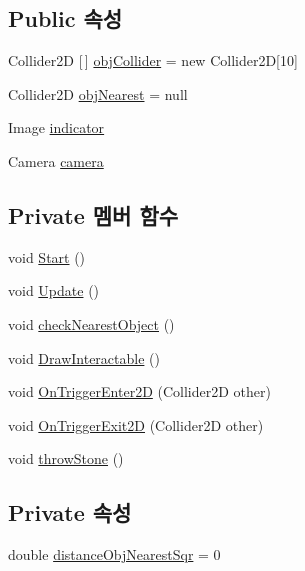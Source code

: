 \subsection*{Public 속성}
\begin{DoxyCompactItemize}
\item 
Collider2D \mbox{[}$\,$\mbox{]} \mbox{\hyperlink{class_interaction_a90d58795726d44ab3a4ba263d4bb232f}{obj\+Collider}} = new Collider2D\mbox{[}10\mbox{]}
\item 
Collider2D \mbox{\hyperlink{class_interaction_ae88d3a10f82937f62190d9a68e3e4fee}{obj\+Nearest}} = null
\item 
Image \mbox{\hyperlink{class_interaction_ab757635fb5137d0da6ced4a50b1ef612}{indicator}}
\item 
Camera \mbox{\hyperlink{class_interaction_a7c2a3d3cca0528ce35017a3f6c5f7822}{camera}}
\end{DoxyCompactItemize}
\subsection*{Private 멤버 함수}
\begin{DoxyCompactItemize}
\item 
void \mbox{\hyperlink{class_interaction_a01ca462a3b63fa7b3f58def0dcc5d8c9}{Start}} ()
\item 
void \mbox{\hyperlink{class_interaction_a411a0868d034a972335ede1c42088c5e}{Update}} ()
\item 
void \mbox{\hyperlink{class_interaction_a57f6e82265f1099e49b7429615ff593f}{check\+Nearest\+Object}} ()
\item 
void \mbox{\hyperlink{class_interaction_a99a346f8b614166a70976db9c7829d83}{Draw\+Interactable}} ()
\item 
void \mbox{\hyperlink{class_interaction_ac6a15155873618a49f8762db31645e9a}{On\+Trigger\+Enter2D}} (Collider2D other)
\item 
void \mbox{\hyperlink{class_interaction_ac372c750eadae87cb84a5505d92edc43}{On\+Trigger\+Exit2D}} (Collider2D other)
\item 
void \mbox{\hyperlink{class_interaction_a306fd6f3cfc49c1a74221277785579ba}{throw\+Stone}} ()
\end{DoxyCompactItemize}
\subsection*{Private 속성}
\begin{DoxyCompactItemize}
\item 
double \mbox{\hyperlink{class_interaction_ab33e183d729a0910ff6dfe3271fff3b3}{distance\+Obj\+Nearest\+Sqr}} = 0
\end{DoxyCompactItemize}


